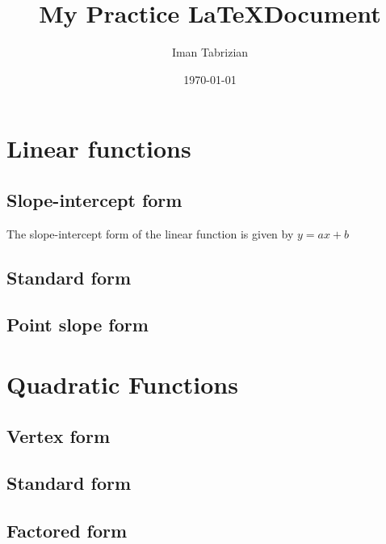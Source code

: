 \documentclass[11pt]{article}
\begin{document}
\tableofcontents

\title{My Practice \LaTeX \space Document}
\author{Iman Tabrizian}
\date{\today}
\maketitle
\section{Linear functions}
	\subsection{Slope-intercept form}
	The slope-intercept form of the linear function is given by $y=ax+b$
	\subsection{Standard form}
	\subsection{Point slope form}
\section{Quadratic Functions}
	\subsection{Vertex form}
	\subsection{Standard form}
	\subsection{Factored form}
\end{document}
